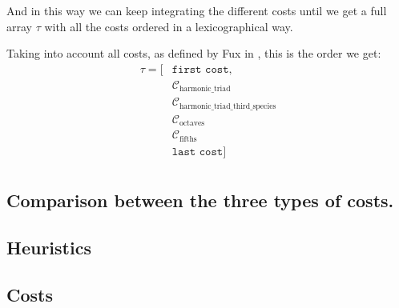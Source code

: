 And in this way we can keep integrating the different costs until we get a full array $\tau$ with all the costs ordered in a lexicographical way.

Taking into account all costs, as defined by Fux in \gap, this is the order we get:
\begin{equation}
    \begin{aligned}
        \tau = [&\texttt{first cost},\\
        &\mathcal{C}_\text{harmonic\_triad} \\
        &\mathcal{C}_\text{harmonic\_triad\_third\_species} \\
        &\mathcal{C}_\text{octaves} \\
        &\mathcal{C}_\text{fifths} \\
        &\texttt{last cost}] \\
    \end{aligned}
\end{equation}

\subsection*{Comparison between the three types of costs.}

\begin{table}[ht]
    \centering
    \caption{Comparison of Options A, B, and C}
    \label{tab:comparison}
\end{table}


\subsection{Heuristics}

\subsection{Costs} \label{costs}